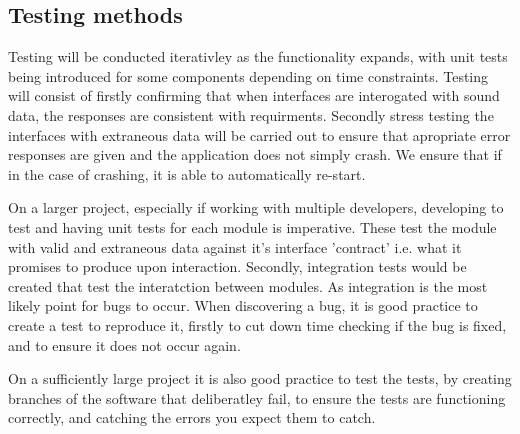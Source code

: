   \subsection{Testing methods}
    Testing will be conducted iterativley as the functionality expands, with unit tests being introduced for some components depending on time constraints. Testing will consist of firstly confirming that when interfaces are interogated with sound data, the responses are consistent with requirments. Secondly stress testing the interfaces with extraneous data will be carried out to ensure that apropriate error responses are given and the application does not simply crash. We ensure that if in the case of crashing, it is able to automatically re-start.
    \par
    On a larger project, especially if working with multiple developers, developing to test and having unit tests for each module is imperative. These test the module with valid and extraneous data against it's interface 'contract' i.e. what it promises to produce upon interaction. Secondly, integration tests would be created that test the interatction between modules. As integration is the most likely point for bugs to occur. When discovering a bug, it is good practice to create a test to reproduce it, firstly to cut down time checking if the bug is fixed, and to ensure it does not occur again.
    \par
    On a sufficiently large project it is also good practice to test the tests, by creating branches of the software that deliberatley fail, to ensure the tests are functioning correctly, and catching the errors you expect them to catch.

